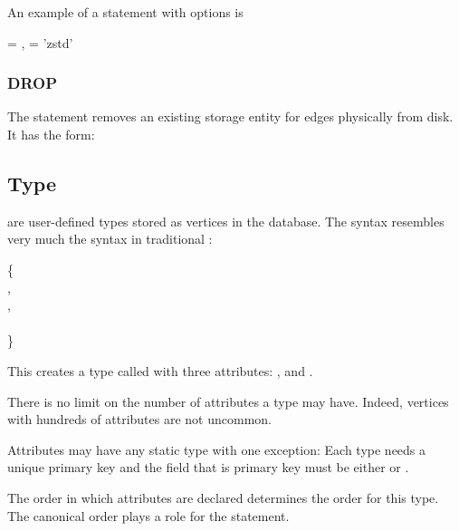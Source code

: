 An example of a  statement with options is

 
  = ,
               = 'zstd'

\subsubsection{DROP}
The  statement removes
an existing storage entity for edges
physically from disk.
It has the form:

 


\subsection{Type}
 are user-defined types
stored as vertices in the database.
The syntax resembles very much
the  syntax
in traditional \sql:

\begin{minipage}{\textwidth}
  \{ \\
\hspace*{1cm}  , \\
\hspace*{1cm} , \\
\hspace*{1cm}  \\
\}
\end{minipage}

This creates a type called 
with three attributes:
,  and .

There is no limit on the number of attributes
a type may have. Indeed, vertices with hundreds
of attributes are not uncommon.

Attributes may have any static type with one exception:
Each type needs a unique primary key and the field
that is primary key must be either
 or .

The order in which attributes are declared
determines the  order for this type.
The canonical order plays a role for the 
statement.

